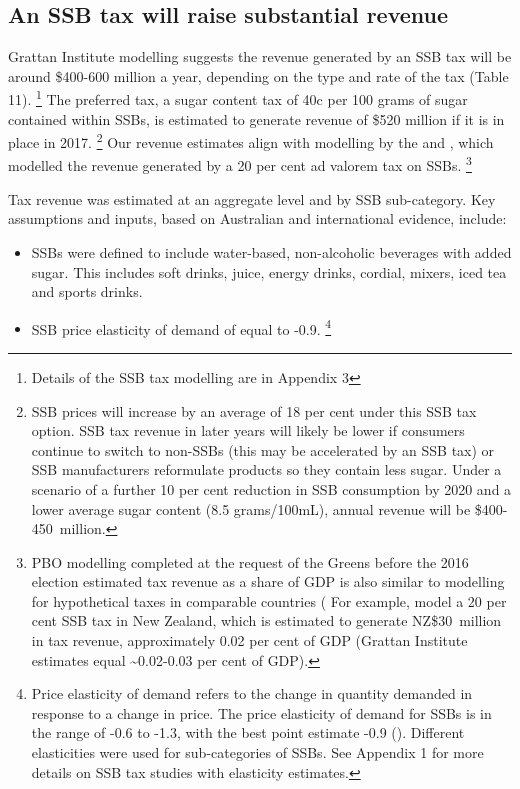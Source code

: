 \documentclass[embargoed]{grattan}
\begin{document}
\subsection{An SSB tax will raise substantial revenue}\label{an-ssb-tax-will-raise-substantial-revenue}


Grattan Institute modelling suggests the revenue generated by an SSB tax will be around \$400-600 million a year, depending on the type and rate of the tax (Table 11).%
\footnote{Details of the SSB tax modelling are in Appendix 3} The preferred tax, a sugar content tax of 40c per 100 grams of sugar contained within SSBs, is estimated to generate revenue of \$520 million if it is in place in 2017.%
\footnote{SSB prices will increase by an average of 18 per cent under this SSB tax option.
SSB tax revenue in later years will likely be lower if consumers continue to switch to non-SSBs (this may be accelerated by an SSB tax) or SSB manufacturers reformulate products so they contain less sugar.
Under a scenario of a further 10 per cent reduction in SSB consumption by 2020 and a lower average sugar content (8.5 grams/100mL), annual revenue will be \$400-450~million.} Our revenue estimates align with modelling by the \textcite{Office2016PolicycostingAustralian} and \textcite{Veerman2016ImpactTaxSugar}, which modelled the revenue generated by a 20 per cent ad valorem tax on SSBs. \footnote{PBO modelling completed at the request of the Greens before the 2016 election estimated tax revenue as a share of GDP is also similar to modelling for hypothetical taxes in comparable countries (\textcites{Andreyeva2011Estimatingpotentialtaxes}{Briggs2013Overallincomespecific} For example, \textcite{Mhurchu2007Nutritionlabelsclaims} model a 20 per cent SSB tax in New Zealand, which is estimated to generate NZ\$30~million in tax revenue, approximately 0.02 per cent of GDP (Grattan Institute estimates equal \textasciitilde{}0.02-0.03 per cent of GDP).}

Tax revenue was estimated at an aggregate level and by SSB sub-category.
Key assumptions and inputs, based on Australian and international evidence, include:

\begin{itemize}
\item
  SSBs were defined to include water-based, non-alcoholic beverages with added sugar.
This includes soft drinks, juice, energy drinks, cordial, mixers, iced tea and sports drinks.
\item
  SSB price elasticity of demand of equal to -0.9.%
\footnote{Price elasticity of demand refers to the change in quantity demanded in response to a change in price.
The price elasticity of demand for SSBs is in the range of -0.6 to -1.3, with the best point estimate -0.9 (\textcites{Andreyeva2010impactfoodprices}{Block2010Pointpurchaseprice}{Sharma2014effectstaxingsugarsweetened}{Yang2016child}{Lineffectssugarsweetened}{Powell2013Assessingpotentialeffectiveness}{Bahl2003uneasycasediscriminatory}{Miao2013Accountingproductsubstitution}{Escobar2013Evidencethattax}).
Different elasticities were used for sub-categories of SSBs.
See Appendix 1 for more details on SSB tax studies with elasticity estimates.}
\end{itemize}
\end{document}
